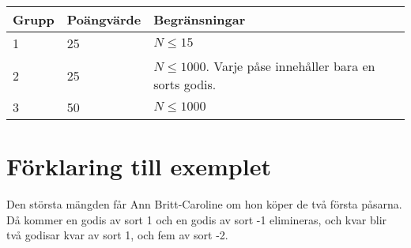\begin{tabular}{| l | l | l |}
	\hline
	Grupp & Poängvärde & Begränsningar\\ \hline
  1     & 25         & $N \le 15$ \\ \hline
  2     & 25         & $N \le 1000$. Varje påse innehåller bara en sorts godis. \\ \hline
  3     & 50         & $N \le 1000$ \\ \hline
\end{tabular}

\section*{Förklaring till exemplet}
Den största mängden får Ann Britt-Caroline om hon köper de två första påsarna. Då kommer en godis av sort 1 och en godis av sort -1 elimineras, och kvar blir två godisar kvar av sort 1, och fem av sort -2.

